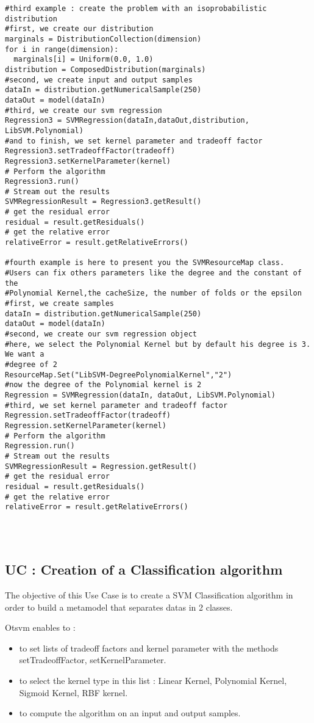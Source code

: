 \begin{lstlisting}
#third example : create the problem with an isoprobabilistic distribution
#first, we create our distribution
marginals = DistributionCollection(dimension)
for i in range(dimension):
  marginals[i] = Uniform(0.0, 1.0)
distribution = ComposedDistribution(marginals)
#second, we create input and output samples
dataIn = distribution.getNumericalSample(250)
dataOut = model(dataIn)
#third, we create our svm regression
Regression3 = SVMRegression(dataIn,dataOut,distribution,
LibSVM.Polynomial) 
#and to finish, we set kernel parameter and tradeoff factor
Regression3.setTradeoffFactor(tradeoff)
Regression3.setKernelParameter(kernel)
# Perform the algorithm
Regression3.run()
# Stream out the results
SVMRegressionResult = Regression3.getResult()
# get the residual error
residual = result.getResiduals()
# get the relative error
relativeError = result.getRelativeErrors()

#fourth example is here to present you the SVMResourceMap class. 
#Users can fix others parameters like the degree and the constant of the 
#Polynomial Kernel,the cacheSize, the number of folds or the epsilon
#first, we create samples
dataIn = distribution.getNumericalSample(250)
dataOut = model(dataIn)
#second, we create our svm regression object
#here, we select the Polynomial Kernel but by default his degree is 3. We want a 
#degree of 2
ResourceMap.Set("LibSVM-DegreePolynomialKernel","2")
#now the degree of the Polynomial kernel is 2
Regression = SVMRegression(dataIn, dataOut, LibSVM.Polynomial)
#third, we set kernel parameter and tradeoff factor
Regression.setTradeoffFactor(tradeoff)
Regression.setKernelParameter(kernel)
# Perform the algorithm
Regression.run()
# Stream out the results
SVMRegressionResult = Regression.getResult()
# get the residual error
residual = result.getResiduals()
# get the relative error
relativeError = result.getRelativeErrors()




\end{lstlisting}


\subsection{UC : Creation of a Classification algorithm}

The objective of this Use Case is to create a SVM Classification algorithm in order to build a metamodel that separates datas in 2 classes.

Otsvm enables to :
\begin{itemize}
 \item to set lists of tradeoff factors and kernel parameter with the methods setTradeoffFactor, setKernelParameter.
 \item to select the kernel type in this list : Linear Kernel, Polynomial Kernel, Sigmoid Kernel, RBF kernel.
 \item to compute the algorithm on an input and output samples.
\end{itemize}

